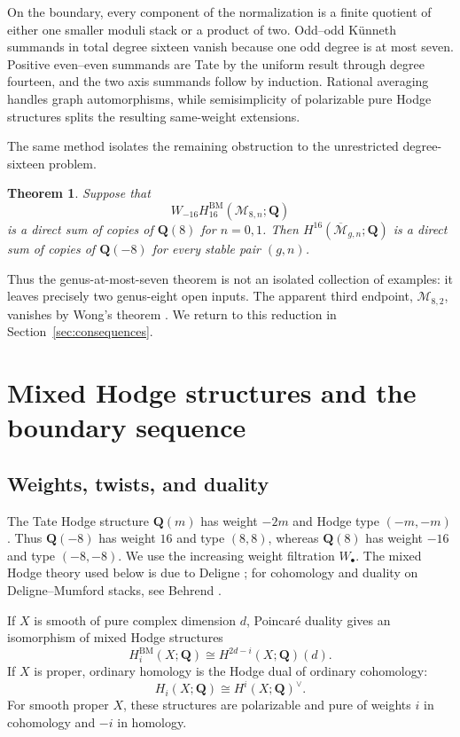 \documentclass[12pt,reqno]{amsart}
\newcommand{\Q}{\mathbf{Q}}
\newcommand{\M}{\mathcal{M}}
\newcommand{\Mbar}{\overline{\mathcal{M}}}
\newcommand{\BM}{\mathrm{BM}}
\newtheorem{theorem}{Theorem}[section]
\theoremstyle{definition}
\theoremstyle{remark}
\begin{document}
On the boundary, every component of the normalization is a finite quotient
of either one smaller moduli stack or a product of two.  Odd--odd K\"unneth
summands in total degree sixteen vanish because one odd degree is at most
seven.  Positive even--even summands are Tate by the uniform result through
degree fourteen, and the two axis summands follow by induction.  Rational
averaging handles graph automorphisms, while semisimplicity of polarizable
pure Hodge structures splits the resulting same-weight extensions.

The same method isolates the remaining obstruction to the unrestricted
degree-sixteen problem.

\begin{theorem}\label{thm:reduction-intro}
Suppose that
\[
 W_{-16}H^{\BM}_{16}(\M_{8,n};\Q)
\]
is a direct sum of copies of $\Q(8)$ for $n=0,1$.  Then
$H^{16}(\Mbar_{g,n};\Q)$ is a direct sum of copies of $\Q(-8)$ for every
stable pair $(g,n)$.
\end{theorem}

Thus the genus-at-most-seven theorem is not an isolated collection of
examples: it leaves precisely two genus-eight open inputs.  The apparent
third endpoint, $\M_{8,2}$, vanishes by Wong's theorem
\cite[Theorem~4.1]{Wong}.  We return to this reduction in
Section~\ref{sec:consequences}.

\section{Mixed Hodge structures and the boundary sequence}
\label{sec:boundary}

\subsection{Weights, twists, and duality}

The Tate Hodge structure $\Q(m)$ has weight $-2m$ and Hodge type
$(-m,-m)$.  Thus $\Q(-8)$ has weight $16$ and type $(8,8)$, whereas
$\Q(8)$ has weight $-16$ and type $(-8,-8)$.  We use the increasing weight
filtration $W_\bullet$.  The mixed Hodge theory used below is due to Deligne
\cite{DeligneHodgeII,DeligneHodgeIII}; for cohomology and duality on
Deligne--Mumford stacks, see Behrend \cite{BehrendStacks}.

If $X$ is smooth of pure complex dimension $d$, Poincar\'e duality gives an
isomorphism of mixed Hodge structures
\begin{equation}\label{eq:pd-smooth}
 H_i^{\BM}(X;\Q)\cong H^{2d-i}(X;\Q)(d).
\end{equation}
If $X$ is proper, ordinary homology is the Hodge dual of ordinary
cohomology:
\begin{equation}\label{eq:proper-dual}
 H_i(X;\Q)\cong H^i(X;\Q)^\vee.
\end{equation}
For smooth proper $X$, these structures are polarizable and pure of weights
$i$ in cohomology and $-i$ in homology.
\end{document}
